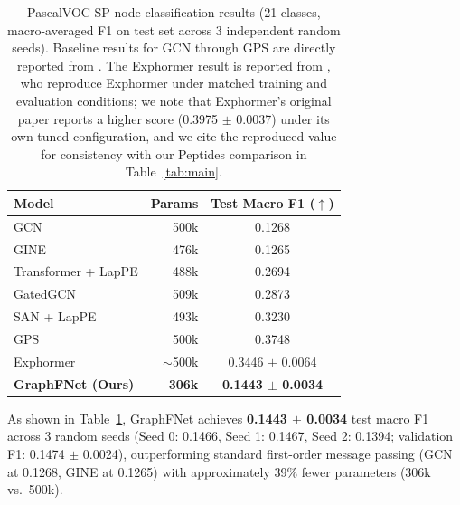 \documentclass[10pt]{article}
\begin{document}
\begin{table}[t]
\caption{PascalVOC-SP node classification results (21 classes, macro-averaged F1 on test set across 3 independent random seeds). Baseline results for GCN through GPS are directly reported from \citet{dwivedi2022long}. The Exphormer result is reported from \citet{wang2024graphmamba}, who reproduce Exphormer \citep{shirzad2023exphormer} under matched training and evaluation conditions; we note that Exphormer's original paper reports a higher score (0.3975 $\pm$ 0.0037) under its own tuned configuration, and we cite the reproduced value for consistency with our Peptides comparison in Table~\ref{tab:main}.}
\label{tab:voc_sp_results}
\centering
\begin{tabular}{lrc}
\toprule
\textbf{Model} & \textbf{Params} & \textbf{Test Macro F1 ($\uparrow$)} \\
\midrule
GCN \citep{kipf2017gcn}                             & 500k  & 0.1268 \\
GINE \citep{hu2020strategies}                       & 476k  & 0.1265 \\
\midrule
Transformer + LapPE \citep{dwivedi2021laplacian}    & 488k  & 0.2694 \\
GatedGCN \citep{bresson2017residual}                 & 509k  & 0.2873 \\
SAN + LapPE \citep{kreuzer2021rethinking}            & 493k  & 0.3230 \\
GPS \citep{rampasek2022recipe}                       & 500k  & 0.3748 \\
Exphormer \citep{shirzad2023exphormer}               & $\sim$500k  & 0.3446 $\pm$ 0.0064 \\
\midrule
\textbf{GraphFNet (Ours)}                           & \textbf{306k} & \textbf{0.1443 $\pm$ 0.0034} \\
\bottomrule
\end{tabular}
\end{table}

As shown in Table~\ref{tab:voc_sp_results}, GraphFNet achieves \textbf{0.1443 $\pm$ 0.0034} test macro F1 across 3 random seeds (Seed 0: 0.1466, Seed 1: 0.1467, Seed 2: 0.1394; validation F1: 0.1474 $\pm$ 0.0024), outperforming standard first-order message passing (GCN at 0.1268, GINE at 0.1265) with approximately 39\% fewer parameters (306k vs.\ 500k). 
\end{document}
